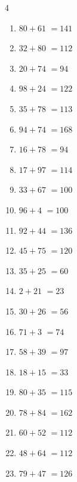 \begin{multicols}{4}
\begin{enumerate}
  \item $80+61$
        $=141$

  \item $32+80$
        $=112$

  \item $20+74$
        $=94$

  \item $98+24$
        $=122$

  \item $35+78$
        $=113$

  \item $94+74$
        $=168$

  \item $16+78$
        $=94$

  \item $17+97$
        $=114$

  \item $33+67$
        $=100$

  \item $96+4$
        $=100$

  \item $92+44$
        $=136$

  \item $45+75$
        $=120$

\columnbreak %

\resetques

  \item $35+25$
        $=60$

  \item $2+21$
        $=23$

  \item $30+26$
        $=56$

  \item $71+3$
        $=74$

  \item $58+39$
        $=97$

  \item $18+15$
        $=33$

  \item $80+35$
        $=115$

  \item $78+84$
        $=162$

  \item $60+52$
        $=112$

  \item $48+64$
        $=112$

  \item $79+47$
        $=126$


\end{enumerate}
\end{multicols}

